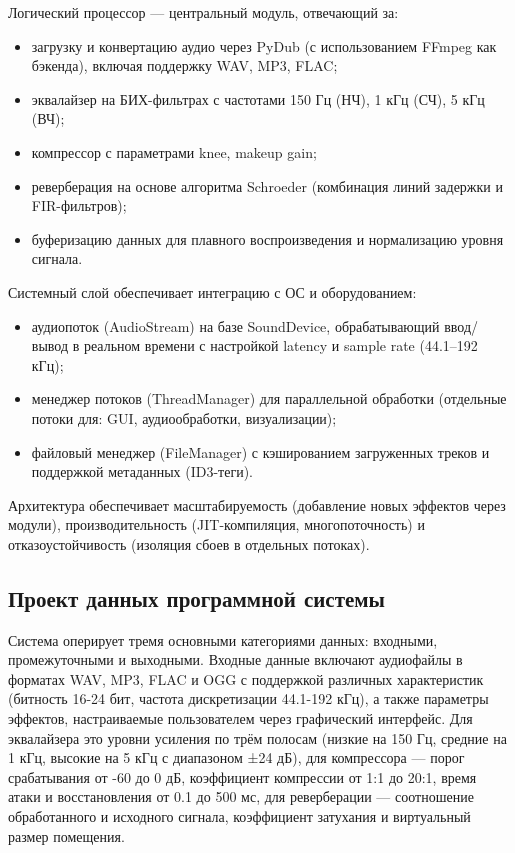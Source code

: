 Логический процессор — центральный модуль, отвечающий за:
\begin{itemize}
	\item загрузку и конвертацию аудио через PyDub (с использованием FFmpeg как бэкенда), включая поддержку WAV, MP3, FLAC;
	\item эквалайзер на БИХ-фильтрах с частотами 150 Гц (НЧ), 1 кГц (СЧ), 5 кГц (ВЧ);
	\item компрессор с параметрами knee, makeup gain;
	\item реверберация на основе алгоритма Schroeder (комбинация линий задержки и FIR-фильтров);
	\item буферизацию данных для плавного воспроизведения и нормализацию уровня сигнала.
\end{itemize}

Системный слой обеспечивает интеграцию с ОС и оборудованием:
\begin{itemize}
	\item аудиопоток (AudioStream) на базе SoundDevice, обрабатывающий ввод/вывод в реальном времени с настройкой latency и sample rate (44.1–192 кГц);
	\item менеджер потоков (ThreadManager) для параллельной обработки (отдельные потоки для: GUI, аудиообработки, визуализации);
	\item файловый менеджер (FileManager) с кэшированием загруженных треков и поддержкой метаданных (ID3-теги).
\end{itemize}

Архитектура обеспечивает масштабируемость (добавление новых эффектов через модули), производительность (JIT-компиляция, многопоточность) и отказоустойчивость (изоляция сбоев в отдельных потоках).

\subsection{Проект данных программной системы}

Система оперирует тремя основными категориями данных: входными, промежуточными и выходными. Входные данные включают аудиофайлы в форматах WAV, MP3, FLAC и OGG с поддержкой различных характеристик (битность 16-24 бит, частота дискретизации 44.1-192 кГц), а также параметры эффектов, настраиваемые пользователем через графический интерфейс. Для эквалайзера это уровни усиления по трём полосам (низкие на 150 Гц, средние на 1 кГц, высокие на 5 кГц с диапазоном ±24 дБ), для компрессора — порог срабатывания от -60 до 0 дБ, коэффициент компрессии от 1:1 до 20:1, время атаки и восстановления от 0.1 до 500 мс, для реверберации — соотношение обработанного и исходного сигнала, коэффициент затухания и виртуальный размер помещения.

